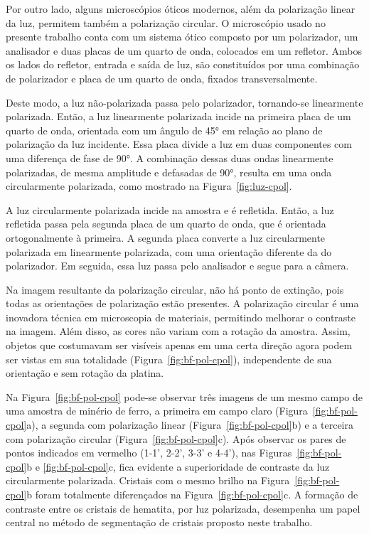 Por outro lado, alguns microscópios óticos modernos, além da
polarização linear da luz, permitem também a polarização
circular.\cite{70} O microscópio usado no presente trabalho conta com
um sistema ótico composto por um polarizador, um analisador e duas
placas de um quarto de onda, colocados em um refletor. Ambos os lados
do refletor, entrada e saída de luz, são constituídos por uma
combinação de polarizador e placa de um quarto de onda, fixados
transversalmente.

Deste modo, a luz não-polarizada passa pelo polarizador, tornando-se
linearmente polarizada. Então, a luz linearmente polarizada incide na
primeira placa de um quarto de onda, orientada com um ângulo de 45° em
relação ao plano de polarização da luz incidente. Essa placa divide a
luz em duas componentes com uma diferença de fase de 90°. A combinação
dessas duas ondas linearmente polarizadas, de mesma amplitude e
defasadas de 90°, resulta em uma onda circularmente polarizada, como
mostrado na Figura~\ref{fig:luz-cpol}.\cite{71}

A luz circularmente polarizada incide na amostra e é refletida. Então,
a luz refletida passa pela segunda placa de um quarto de onda, que é
orientada ortogonalmente à primeira. A segunda placa converte a luz
circularmente polarizada em linearmente polarizada, com uma orientação
diferente da do polarizador. Em seguida, essa luz passa pelo
analisador e segue para a câmera.\cite{71}

Na imagem resultante da polarização circular, não há ponto de
extinção, pois todas as orientações de polarização estão
presentes.\cite{71} A polarização circular é uma inovadora técnica em
microscopia de materiais, permitindo melhorar o contraste na
imagem. Além disso, as cores não variam com a rotação da
amostra. Assim, objetos que costumavam ser visíveis apenas em uma
certa direção agora podem ser vistas em sua totalidade
(Figura~\ref{fig:bf-pol-cpol}), independente de sua orientação e sem
rotação da platina.\cite{50}

Na Figura~\ref{fig:bf-pol-cpol} pode-se observar três imagens de um
mesmo campo de uma amostra de minério de ferro, a primeira em campo
claro (Figura~\ref{fig:bf-pol-cpol}a), a segunda com polarização
linear (Figura~\ref{fig:bf-pol-cpol}b) e a terceira com polarização
circular (Figura~\ref{fig:bf-pol-cpol}c). Após observar os pares de
pontos indicados em vermelho (1-1', 2-2', 3-3' e 4-4'), nas
Figuras~\ref{fig:bf-pol-cpol}b e \ref{fig:bf-pol-cpol}c, fica evidente
a superioridade de contraste da luz circularmente polarizada. Cristais
com o mesmo brilho na Figura~\ref{fig:bf-pol-cpol}b foram totalmente
diferençados na Figura~\ref{fig:bf-pol-cpol}c. A formação de contraste
entre os cristais de hematita, por luz polarizada, desempenha um papel
central no método de segmentação de cristais proposto neste trabalho.

